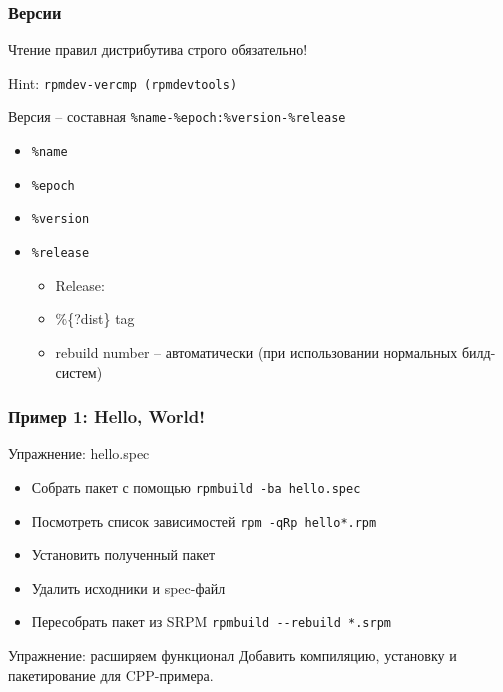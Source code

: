 \begin{frame}
	\frametitle{Версии}

	\Large{Чтение правил дистрибутива строго обязательно!}

	Hint: {\tt rpmdev-vercmp (rpmdevtools)}
	\begin{block}{ Версия -- составная}
		{\tt \%name-\%epoch:\%version-\%release}
		\begin{itemize}
			\item {\tt \%name}
			\item {\tt \%epoch}
			\item {\tt \%version}
			\item {\tt \%release}
			\begin{itemize}
				\item Release:
				\item \%\{?dist\} tag
				\item rebuild number -- автоматически (при использовании нормальных билд-систем)
			\end{itemize}
		\end{itemize}
	\end{block}

\end{frame}



\begin{frame}
	\frametitle{Пример 1: Hello, World!}

	\begin{block}{Упражнение: hello.spec}
		\begin{itemize}
			\item Собрать пакет с помощью {\tt rpmbuild -ba hello.spec}
			\item Посмотреть список зависимостей {\tt rpm -qRp hello*.rpm}
			\item Установить полученный пакет
			\item Удалить исходники и spec-файл
			\item Пересобрать пакет из SRPM {\tt rpmbuild -{}-rebuild *.srpm}
		\end{itemize}
	\end{block}

	\pause

	\begin{block}{Упражнение: расширяем функционал}
		Добавить компиляцию, установку и пакетирование для CPP-примера.
	\end{block}

\end{frame}

